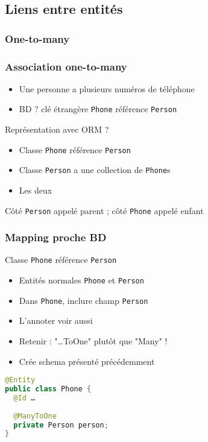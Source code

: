 \documentclass[english, french]{beamer}
\begin{document}
\subsection{Liens entre entités}
\subsubsection{One-to-many}
\begin{frame}
	\frametitle{Association one-to-many}
	\begin{itemize}
		\item Une personne a plusieurs numéros de téléphone
		\item BD ? \pause clé étrangère \texttt{Phone} référence \texttt{Person}
	\end{itemize}
	\pause
	
	\vspace{1em}
	Représentation avec ORM ? \pause
	\begin{itemize}
		\item Classe \texttt{Phone} référence \texttt{Person}
		\item Classe \texttt{Person} a une collection de \texttt{Phone}s
		\item Les deux
	\end{itemize}
	Côté \texttt{Person} appelé parent ; côté \texttt{Phone} appelé enfant
\end{frame}

\begin{frame}[fragile]
	\frametitle{Mapping proche BD}
	Classe \texttt{Phone} référence \texttt{Person}
	\begin{itemize}
		\item Entités normales \texttt{Phone} et \texttt{Person}
		\item Dans \texttt{Phone}, inclure champ \texttt{Person}
		\item L’annoter  {\tiny voir aussi }
		\item Retenir : "…ToOne" plutôt que "Many" !
		 \item Crée schema présenté précédemment
	\end{itemize}
	\begin{lstlisting}[language=Java]
@Entity
public class Phone {
  @Id …
  
  @ManyToOne
  private Person person;
}
	\end{lstlisting}
\end{frame}
\end{document}
